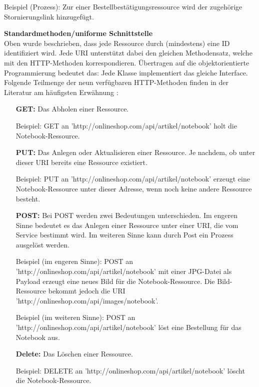 \documentclass[11pt, a4paper, titlepage, listof=totoc, bibliography=totoc, index=totoc, twoside, openright, headings=normal]{scrreprt}
\begin{document}
Beispiel (Prozess): Zur einer Bestellbestätigungsressource wird der zugehörige Stornierungslink hinzugefügt.

\textbf{Standardmethoden/uniforme Schnittstelle}\\
Oben wurde beschrieben, dass jede Ressource durch (mindestens) eine ID identifiziert wird. Jede URI unterstützt dabei den gleichen Methodensatz, welche mit den HTTP-Methoden korrespondieren. Übertragen auf die objektorientierte Programmierung bedeutet das: Jede Klasse implementiert das gleiche Interface. Folgende Teilmenge der neun verfügbaren HTTP-Methoden finden in der Literatur am häufigsten Erwähnung \citep{richardson07, tilkov11, wilde11}:
\begin{enumerate}[a.]
\item [\textbf{GET:}] Das Abholen einer Ressource.\vspace{0.2em}

Beispiel: GET an 'http://onlineshop.com/api/artikel/notebook' holt die Notebook-Ressource.
\item [\textbf{PUT:}] Das Anlegen oder Aktualisieren einer Ressource. Je nachdem, ob unter dieser URI bereits eine Ressource existiert.\vspace{0.2em}

Beispiel: PUT an 'http://onlineshop.com/api/artikel/notebook' erzeugt eine Notebook-Ressource unter dieser Adresse, wenn noch keine andere Ressource besteht.
\item [\textbf{POST:}] Bei POST werden zwei Bedeutungen unterschieden. Im engeren Sinne bedeutet es das Anlegen einer Ressource unter einer URI, die vom Service bestimmt wird. Im weiteren Sinne kann durch Post ein Prozess ausgelöst werden.\vspace{0.2em}

Beispiel (im engeren Sinne): POST an 'http://onlineshop.com/api/artikel/notebook' mit einer JPG-Datei als Payload erzeugt eine neues Bild für die Notebook-Ressource. Die Bild-Ressource bekommt jedoch die URI 'http://onlineshop.com/api/images/notebook'.

Beispiel (im weiteren Sinne): POST an 'http://onlineshop.com/api/artikel/notebook' löst eine Bestellung für das Notebook aus.
\item [\textbf{Delete:}] Das Löschen einer Ressource.\vspace{0.2em}

Beispiel: DELETE an 'http://onlineshop.com/api/artikel/notebook' löscht die Notebook-Ressource.
\end{enumerate}
\end{document}

